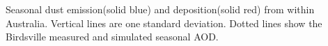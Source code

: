 \label{fig:seasonaldust}

Seasonal dust emission(solid blue) and deposition(solid red) from within Australia.
Vertical lines are one standard deviation.
Dotted lines show the Birdsville measured and simulated seasonal AOD.
